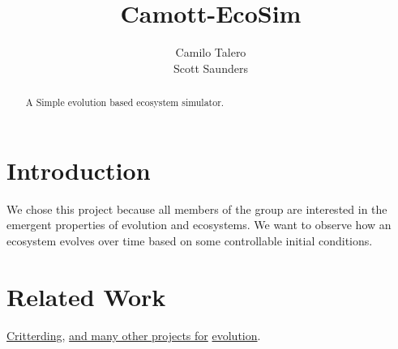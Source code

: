 \documentclass[runningheads]{llncs}
\begin{document}
%
\title{Camott-EcoSim}
%
\author{Camilo Talero \\  Scott Saunders  }
%
%
\maketitle
%
%
\begin{abstract}
A Simple evolution based ecosystem simulator.
\end{abstract}
%
%
\section{Introduction}
\label{sec:Introduction}
%
We chose this project because all members of the group are interested in the emergent properties of evolution and ecosystems. We want to observe how an ecosystem evolves over time based on some controllable initial conditions.
%
\section{Related Work}
\href{http://critterding.sourceforge.net/}{Critterding}, \href{https://www.google.ca/search?sclient=psy-ab&safe=off&btnG=Search&q=evolution+sim#safe=off&q=eco+sim}{and many other projects for} \href{https://www.google.ca/search?sclient=psy-ab&safe=off&btnG=Search&q=evolution+sim}{evolution}.
%
\end{document}
